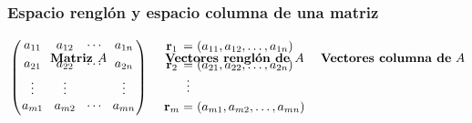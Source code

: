 
\subsection{}

{\nologo
\begin{frame}\frametitle{Espacio renglón y espacio columna de una matriz}
	
	\begin{columns}[c]
		\begin{column}{1.15\textwidth}
			\[
			\begin{array}{@{\hspace{0.1\tabcolsep}}c@{\hspace{2\tabcolsep}}c@{\hspace{2\tabcolsep}}c@{\hspace{0.1\tabcolsep}}}
			\text{\textbf{Matriz }} A & \text{\textbf{Vectores renglón de }} A & \text{\textbf{Vectores columna de} } A \\[-8mm] 
			{\left(
				\begin{array}{@{\hspace{0.1\tabcolsep}}c@{\hspace{1.5\tabcolsep}}c@{\hspace{1.5\tabcolsep}}c@{\hspace{1.5\tabcolsep}}c@{\hspace{0.1\tabcolsep}}}
				a_{11} & a_{12} & \cdots & a_{1n} \\[1mm]
				a_{21} & a_{22} & \cdots & a_{2n} \\[1mm]
				\vdots & \vdots &        & \vdots \\[0mm]
				a_{m1} & a_{m2} & \cdots & a_{mn} \\[1mm]
				\end{array}
				\right)
				\atop		
			}
			& 
			\begin{array}{@{\hspace{0.1\tabcolsep}}c@{\hspace{0.5\tabcolsep}}c@{\hspace{0.5\tabcolsep}}l@{\hspace{0.1\tabcolsep}}}
			\mathbf{r}_1 & = & (a_{11},a_{12},\hdots, a_{1n})\\[1mm]
			\mathbf{r}_2 & = & (a_{21},a_{22},\hdots, a_{2n})\\
			& \vdots & \\[1mm]
			\mathbf{r}_m  & = & (a_{m1},a_{m2},\hdots, a_{mn})\\[1.1cm]

\end{array}
\end{array}\]
\end{column}
\end{columns}
\end{frame}}
